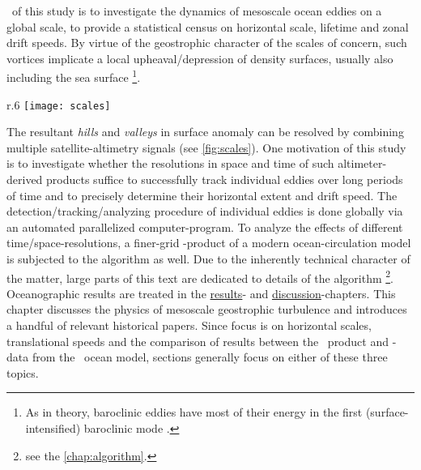 

~of this study is to investigate the dynamics of mesoscale ocean eddies on a global scale, \ie to provide a statistical census on horizontal scale, lifetime and zonal drift speeds.
By virtue of the geostrophic character of the scales of concern, such vortices implicate a local upheaval/depression of density surfaces, usually also including the sea surface \footnote{As in theory, baroclinic eddies have most of their energy in the first (surface-intensified) baroclinic mode \citep{olbers2012ocean}.}.
\begin{wrapfigure}{r}{.6\textwidth}
\texttt{[image: scales]}
\caption{Resolutions for model vs satellite. Modified version from \citet{olbers2012ocean}.}
\label{fig:scales}
\end{wrapfigure}
 The resultant \textit{hills} and \textit{valleys} in surface anomaly can be resolved by combining multiple satellite-altimetry signals (see \cref{fig:scales}). One motivation of this study is to investigate whether the resolutions in space and time of such altimeter-derived products suffice to successfully track individual eddies over long periods of time and to precisely determine their horizontal extent and drift speed. The detection/tracking/analyzing procedure of individual eddies is done globally via an automated parallelized computer-program. 
To analyze the effects of different time/space-resolutions, a finer-grid \SSH-product of a modern ocean-circulation model is subjected to the algorithm as well.
Due to the inherently technical character of the matter, large parts of this text are dedicated to details of the algorithm \footnote{see the \cref{chap:algorithm}.}. Oceanographic results are treated in the \href{chap:results}{results}- and \href{chap:discussion}{discussion}-chapters. This chapter discusses the physics of mesoscale geostrophic turbulence and introduces a handful of relevant historical papers. Since focus is on horizontal scales, translational speeds and the comparison of results between the \AVI~product and \SSH-data from the \POP~ocean model, sections generally focus on either of these three topics.


